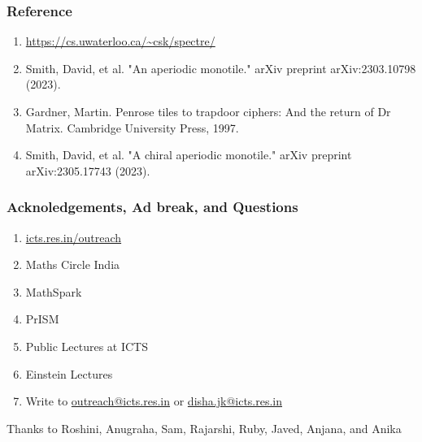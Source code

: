 \documentclass{beamer}
\begin{document}
\begin{frame}
    \frametitle{Reference}
    \begin{enumerate}
        \item \url{https://cs.uwaterloo.ca/~csk/spectre/}
        \item Smith, David, et al. "An aperiodic monotile." arXiv preprint arXiv:2303.10798 (2023).
        \item Gardner, Martin. Penrose tiles to trapdoor ciphers: And the return of Dr Matrix. Cambridge University Press, 1997.
        \item Smith, David, et al. "A chiral aperiodic monotile." arXiv preprint arXiv:2305.17743 (2023).
    \end{enumerate}
\end{frame}
\begin{frame}
    \frametitle{Acknoledgements, Ad break, and Questions}
    \begin{enumerate}
        \item \url{icts.res.in/outreach}
        \item Maths Circle India
        \item MathSpark
        \item PrISM
        \item Public Lectures at ICTS 
        \item Einstein Lectures
        \item Write to \url{outreach@icts.res.in} or \url{disha.jk@icts.res.in}
    \end{enumerate}
    \vspace{0.5cm}
    Thanks to Roshini, Anugraha, Sam, Rajarshi, Ruby, Javed, Anjana, and Anika 
\end{frame}
\end{document}
